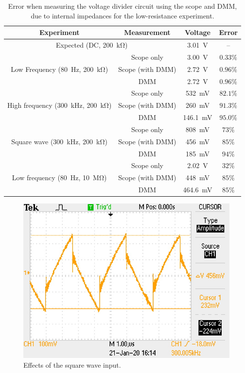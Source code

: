 \documentclass{report}
\begin{document}
\begin{table}[h]
	\centering
	\caption{Error when measuring the voltage divider circuit using the scope and DMM, due to internal impedances for the low-resistance experiment.}
	\begin{threeparttable}
		\label{table:2res}
		\begin{tabular}{cccc}
			\toprule
			Experiment & Measurement & Voltage & Error \\
			\midrule
			\multicolumn{2}{c}{Expected (DC, \SI{200}{\kohm})} & \SI{3.01}{\V} & --\\
			\midrule
			\multirow{3}{*}{Low Frequency (\SI{80}{\Hz}, \SI{200}{\kohm})} & Scope only & \SI{3.00}{\V} & $0.33\%$\\
			& Scope (with DMM) & \SI{2.72}{\V} & $0.96\%$ \\
			& DMM & \SI{2.72}{\V} & $0.96\%$ \\
			\midrule
			\multirow{3}{*}{High frequency (\SI{300}{\kHz}, \SI{200}{\kohm})} & Scope only & \SI{532}{\mV} & $82.1\%$ \\
			& Scope (with DMM) &  \SI{260}{\mV} & $91.3\%$ \\
			& DMM & \SI{146.1}{\mV} & $95.0\%$ \\
			\midrule
			\multirow{3}{*}{Square wave (\SI{300}{\kHz}, \SI{200}{\kohm})} & Scope only & \SI{808}{\mV} & $73\%$\\
			& Scope (with DMM) & \SI{456}{\mV} & $85\%$ \\
			& DMM & \SI{185}{\mV} & $94\%$ \\
			\midrule
			\multirow{3}{*}{Low frequency (\SI{80}{\Hz}, \SI{10}{\mega\ohm})} & Scope only & \SI{2.02}{\V} & $32\%$ \\
			& Scope (with DMM) & \SI{448}{\mV} & $85\%$  \\
			& DMM & \SI{464.6}{\mV} & $85\%$ \\
			\bottomrule
		\end{tabular}
	\end{threeparttable}
\end{table}


\begin{figure}[H]
	\centering
	\includegraphics[width=0.6\linewidth]{ALL0002/F0002TEK}
	\caption{Effects of the square wave input.}
	\label{fig:square}
\end{figure}
\end{document}
